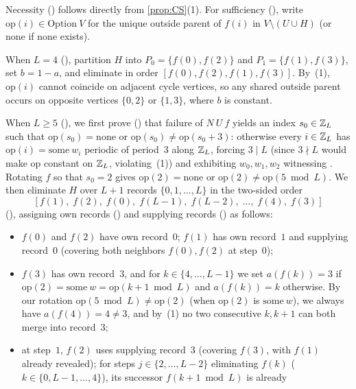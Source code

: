 \begin{outline}
Necessity () follows directly from \cref{prop:CS}(1). For sufficiency
(), write $\mathrm{op}(i) \in \mathrm{Option}\ V$ for the unique outside parent
of $f(i)$ in $V \setminus (U \cup H)$ (or $\mathrm{none}$ if none exists).

When $L = 4$ (), partition $H$ into $P_0 = \{f(0), f(2)\}$ and $P_1 = \{f(1), f(3)\}$, set
$b = 1 - a$, and eliminate in order $[f(0), f(2), f(1), f(3)]$. By~(1), $\mathrm{op}(i)$ cannot coincide on adjacent cycle
vertices, so any shared outside parent occurs on opposite vertices $\{0, 2\}$ or $\{1, 3\}$, where $b$ is constant.

When $L \ge 5$ (), we first prove () that failure of
 $N\ U\ f$ yields an index $s_0 \in \mathbb{Z}_L$ such that $\mathrm{op}(s_0) = \mathrm{none}$ or
$\mathrm{op}(s_0) \ne \mathrm{op}(s_0 + 3)$: otherwise
every $i \in \mathbb{Z}_L$ has $\mathrm{op}(i) = \mathrm{some}\ w_i$ periodic of period~$3$ along $\mathbb{Z}_L$, forcing $3 \mid L$ (since
$3 \nmid L$ would make $\mathrm{op}$ constant on $\mathbb{Z}_L$, violating~(1)) and exhibiting $w_0, w_1, w_2$ witnessing
. Rotating $f$ so that $s_0 = 2$ gives $\mathrm{op}(2) = \mathrm{none}$ or $\mathrm{op}(2) \ne
\mathrm{op}(5 \bmod L)$. We then eliminate $H$ over $L + 1$ records $\{0, 1, \dots, L\}$ in the two-sided order
\[
  [f(1),\; f(2),\; f(0),\; f(L-1),\; f(L-2),\; \dots,\; f(4),\; f(3)]
\]
(), assigning own records () and supplying records () as follows:
\begin{itemize}
\item $f(0)$ and $f(2)$ have own record~$0$; $f(1)$ has own record~$1$ and supplying record~$0$ (covering both neighbors
  $f(0), f(2)$ at step~$0$);
\item $f(3)$ has own record~$3$, and for $k \in \{4, \dots, L-1\}$ we set $a(f(k)) = 3$ if $\mathrm{op}(2) = \mathrm{some}\ w
  = \mathrm{op}(k + 1 \bmod L)$ and $a(f(k)) = k$ otherwise. By our rotation $\mathrm{op}(5 \bmod L) \ne \mathrm{op}(2)$
  (when $\mathrm{op}(2)$ is $\mathrm{some}\ w$), we always have $a(f(4)) = 4 \ne 3$, and by~(1) no two consecutive $k, k+1$
  can both merge into record~$3$;
\item at step~$1$, $f(2)$ uses supplying record~$3$ (covering $f(3)$, with $f(1)$ already revealed); for steps
  $j \in \{2, \dots, L-2\}$ eliminating $f(k)$ ($k \in \{0, L-1, \dots, 4\}$), its successor $f(k+1 \bmod L)$ is already

\end{itemize}
\end{outline}
